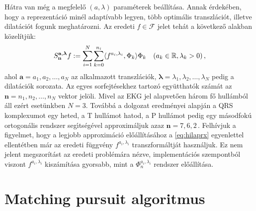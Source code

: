 \documentclass[oneside,titlepage,12pt,a4paper]{report}
\begin{document}
Hátra van még a megfelelő $(a,\lambda)$ paraméterek beállítása. Annak érdekében, hogy a reprezentáció minél adaptívabb legyen, több  optimális transzlációt, illetve dilatációt fogunk meghatározni. Az eredeti $f\in\mathcal{F}$ jelet tehát a következő alakban közelítjük:
\begin{equation*}
	S_{\mathbf{n}}^{\mathbf{a},\boldsymbol{\lambda}}f:=\sum_{i=1}^N\sum_{k=0}^{n_i} \langle f^{a_i,\lambda_i},\Phi_{k}\rangle\Phi_{k} \quad
	(a_k \in \Bbb R,\lambda_k>0)\,,
\end{equation*}
ahol $\mathbf{a}=a_1, a_2, \ldots, a_N$ az alkalmazott transzlációk, $\boldsymbol{\lambda}=\lambda_1, \lambda_2, \ldots, \lambda_N$ pedig a dilatációk sorozata. Az egyes sorfejtésekhez tartozó együtthatók számát az $\mathbf{n}=n_1, n_2, \ldots, n_N$ vektor jelöli. Mivel az EKG jel alapvetően három fő hullámból áll ezért esetünkben $N=3.$ Továbbá a \cite{hexp3} dolgozat eredm\'enyei alapj\'an
a QRS komplexumot egy heted, a T hull\'amot hatod, a P hull\'amot pedig egy m\'asodfok\'u ortogon\'alis rendszer seg\'\i ts\'eg\'evel approxim\'aljuk azaz $\mathbf{n}=7,6,2\,.$ Felhívjuk a figyelmet, hogy a legjobb approximáció előállításához a \eqref{eq:hilaprx} egyenlettel ellentétben már az eredeti függvény $f^{a_i,\lambda_i}$ transzformáltját használjuk. Ez nem jelent megszorítást az eredeti problémára nézve, implementációs szempontból viszont $f^{a_i,\lambda_i}$ kiszámítása gyorsabb, mint a $\Phi_n^{a_i,\lambda_i}$ rendszer előállítása.

\section{Matching pursuit algoritmus}
\end{document}
